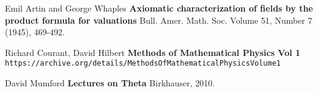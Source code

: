 \documentclass[12pt]{article}
\begin{document}
\begin{thebibliography}{}

\item Emil Artin and George Whaples \textbf{Axiomatic characterization of fields by the product formula for valuations} Bull. Amer. Math. Soc.
Volume 51, Number 7 (1945), 469-492.

\item Richard Courant, David Hilbert \textbf{Methods of Mathematical Physics Vol 1} \\
\texttt{https://archive.org/details/MethodsOfMathematicalPhysicsVolume1}

\item David Mumford \textbf{Lectures on Theta} Birkhauser, 2010.




\end{thebibliography}
\end{document}
